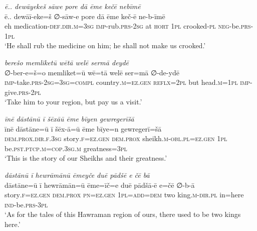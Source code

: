 \ea \label{DG.66}
\textit{ē.. dewāyekeš sāwe pore dā ēme kečē nebīmē} \\ 
\gll ē.. dewāī-eke=š ∅-sāw-e pore dā ēme keč-ē ne-b-īmē \\ 
 eh medication\textsc{-def}\textsc{.dir}\textsc{.m}\textsc{=3sg} \textsc{imp-}rub\textsc{.prs}-\textsc{2sg} at \textsc{hort} \textsc{1pl} crooked\textsc{\textsc{-pl}} \textsc{neg-}be\textsc{.prs}-\textsc{1pl} \\ 
\glt `He shall rub the medicine on him; he shall not make us crooked.'
\z 
 
\ea \label{DG.68}
\textit{berešo memliketū wētā welē sermā deydē} \\ 
\gll ∅-ber-e=š=o memliket=ū wē=tā welē ser=mā ∅-de-ydē \\ 
 \textsc{imp-}take\textsc{.prs}-\textsc{2sg}\textsc{=3sg}\textsc{=\textsc{compl}} country\textsc{.m}\textsc{=ez}\textsc{.gen} \textsc{reflx}\textsc{=2pl} but head\textsc{.m}\textsc{=1pl} \textsc{imp-}give\textsc{.prs}\textsc{-2pl} \\ 
\glt `Take him to your region, but pay us a visit.'
\z 
 
\ea \label{DG.73}
\textit{īnē dāstānū ī šēxāū ēme bīyen gewregerīšā} \\ 
\gll īnē dāstāne=ū ī šēx-ā=ū ēme bīye=n gewregerī=šā \\ 
 \textsc{dem.prox}\textsc{.dir}\textsc{\textsc{.f}}\textsc{.3sg} story\textsc{\textsc{.f}}\textsc{=ez}\textsc{.gen} \textsc{dem.prox} sheikh\textsc{.m}\textsc{-obl}\textsc{.pl}=\textsc{ez.gen} \textsc{1pl} be\textsc{.pst}\textsc{.ptcp}\textsc{.m}\textsc{=cop}\textsc{.3sg}\textsc{.m} greatness\textsc{=3pl} \\ 
\glt `This is the story of our Sheikhs and their greatness.'
\z 
 

\ea \label{DP.1}
\textit{dāstānū ī hewrāmānū ēmeyče duē pādšē e čē bā} \\ 
\gll dāstāne=ū ī hewrāmān=ū ēme=īč=e duē pādšā-ē e=čē ∅-b-ā \\ 
 story\textsc{\textsc{.f}}\textsc{=ez}\textsc{.gen} \textsc{dem.prox} \textsc{pn}\textsc{=ez}\textsc{.gen} \textsc{1pl}\textsc{=add}\textsc{=dem} two king\textsc{.m}\textsc{-dir}\textsc{.pl} in=here \textsc{ind-}be\textsc{.prs}\textsc{-3pl} \\ 
\glt `As for the tales of this Hawraman region of ours, there used to be two kings here.'
\z 
 
